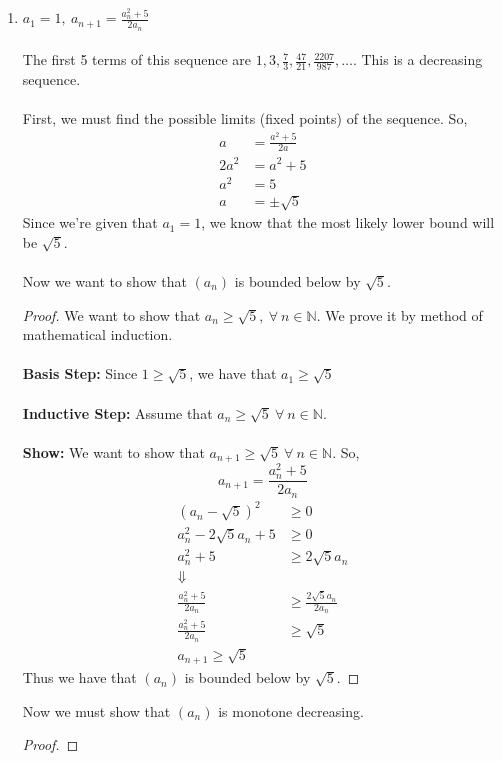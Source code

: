 \documentclass[12pt,letterpaper]{article}
\newcommand{\N}{\mathbb{N}}
\theoremstyle{case}
\theoremstyle{definition}
\begin{document}
\begin{enumerate}
\begin{enumerate}
		\item $a_1 = 1,\ a_{n+1}=\frac{a_n^2+5}{2a_n}$
		\\\\The first 5 terms of this sequence are $1, 3, \frac{7}{3}, \frac{47}{21}, \frac{2207}{987}, \dots$. This is a decreasing sequence.
		\\\\First, we must find the possible limits (fixed points) of the sequence. So,
		\begin{align*}
			a&=\frac{a^2+5}{2a} \\
			2a^2 &= a^2+5 \\
			a^2 &= 5 \\
			a &= \pm \sqrt{5}
		\end{align*}
		Since we're given that $a_1=1$, we know that the most likely lower bound will be $\sqrt{5}$.
		\\\\Now we want to show that $(a_n)$ is bounded below by $\sqrt{5}$.
		\begin{proof}
			We want to show that $a_n \geq \sqrt{5},\ \forall\ n \in \N$. We prove it by method of mathematical induction.
			\\\\\textbf{Basis Step:} Since $1 \geq \sqrt{5}$, we have that $a_1 \geq \sqrt{5}$
			\\\\\textbf{Inductive Step:} Assume that $a_n \geq \sqrt{5}\ \forall\ n \in \N$.
			\\\\\textbf{Show:} We want to show that $a_{n+1} \geq \sqrt{5}\ \forall\ n \in \N$. So, 
			\[a_{n+1} = \frac{a_n^2 + 5}{2a_n}\]
			\begin{align*}
				(a_n-\sqrt{5})^2 &\geq 0 \\
				a_n^2 -2\sqrt{5}a_n +5 &\geq 0 \\
				a_n^2 +5 &\geq 2\sqrt{5}a_n \\
				\Downarrow \\
				\frac{a_n^2+5}{2a_n} &\geq \frac{2\sqrt{5}a_n}{2a_n} \\
				\frac{a_n^2+5}{2a_n} &\geq \sqrt{5} \\
				a_{n+1} \geq \sqrt{5}
			\end{align*}
			Thus we have that $(a_n)$ is bounded below by $\sqrt{5}$.
		\end{proof}
		Now we must show that $(a_n)$ is monotone decreasing.\\
		\begin{proof}

\end{proof}
\end{enumerate}
\end{enumerate}
\end{document}
